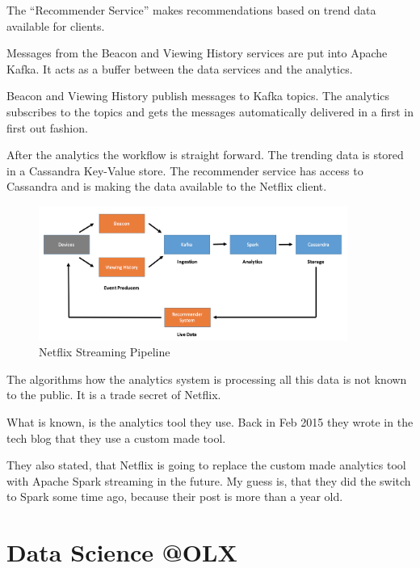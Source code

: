 \documentclass[12pt, numbers=noenddot]{scrreprt} %
\begin{document}
The “Recommender Service” makes recommendations based on trend data available for clients.

Messages from the Beacon and Viewing History services are put into Apache Kafka.
It acts as a buffer between the data services and the analytics.

Beacon and Viewing History publish messages to Kafka topics. The analytics subscribes to the topics and gets the messages automatically delivered in a first in first out fashion.

After the analytics the workflow is straight forward. The trending data is stored in a Cassandra Key-Value store. The recommender service has access to Cassandra and is making the data available to the Netflix client.

\begin{figure}[htbp]
  \centering
     \includegraphics[width=0.9\textwidth]{images/Netflix-Streaming-Pipeline.png}
  \caption{Netflix Streaming Pipeline}
  \label{fig:Bild1}
\end{figure}


The algorithms how the analytics system is processing all this data is not known to the public. It is a trade secret of Netflix.

What is known, is the analytics tool they use. Back in Feb 2015 they wrote in the tech blog that they use a custom made tool.

They also stated, that Netflix is going to replace the custom made analytics tool with Apache Spark streaming in the future. My guess is, that they did the switch to Spark some time ago, because their post is more than a year old.

\section{Data Science @OLX}
\end{document}
